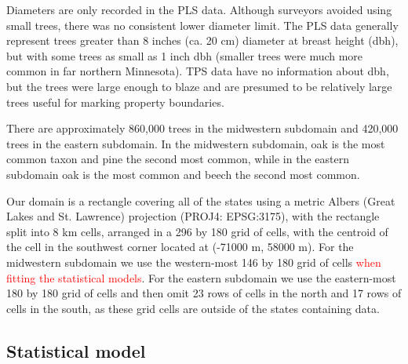 \documentclass[10pt,letterpaper]{article}
\begin{document}
Diameters are only recorded in the PLS data. Although surveyors avoided
using small trees, there was no consistent lower diameter limit. The
PLS data generally represent trees greater than 8 inches (ca. 20
cm) diameter at breast height (dbh), but with some trees as small
as 1 inch dbh (smaller trees were much more common in far northern
Minnesota). TPS data have no information about dbh, but the trees
were large enough to blaze and are presumed to be relatively large
trees useful for marking property boundaries.

There are approximately 860,000 trees in the midwestern subdomain
and 420,000 trees in the eastern subdomain. In the midwestern subdomain,
oak is the most common taxon and pine the second most common, while
in the eastern subdomain oak is the most common and beech the second
most common.

Our domain is a rectangle covering all of the states using a metric
Albers (Great Lakes and St. Lawrence) projection (PROJ4: EPSG:3175),
with the rectangle split into 8 km cells, arranged in a 296 by 180
grid of cells, with the centroid of the cell in the southwest corner
located at (-71000 m, 58000 m). For the midwestern subdomain we use
the western-most 146 by 180 grid of cells\textcolor{red}{{} when fitting
the statistical models}. For the eastern subdomain we use the eastern-most
180 by 180 grid of cells and then omit 23 rows of cells in the north
and 17 rows of cells in the south, as these grid cells are outside
of the states containing data.



\subsection*{Statistical model\label{sec:Statistical-model}}
\end{document}
